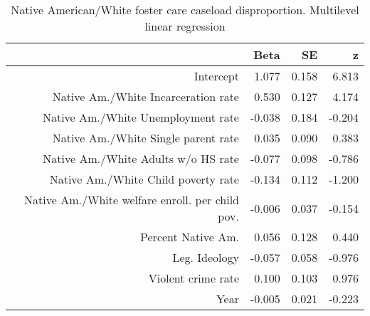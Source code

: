 \begin{table}[ht]
\centering
\begin{tabular}{rrrr}
  \hline
 & Beta & SE & z \\ 
  \hline
Intercept & 1.077 & 0.158 & 6.813 \\ 
  Native Am./White Incarceration rate & 0.530 & 0.127 & 4.174 \\ 
  Native Am./White Unemployment rate & -0.038 & 0.184 & -0.204 \\ 
  Native Am./White Single parent rate & 0.035 & 0.090 & 0.383 \\ 
  Native Am./White Adults w/o HS rate & -0.077 & 0.098 & -0.786 \\ 
  Native Am./White Child poverty rate & -0.134 & 0.112 & -1.200 \\ 
  Native Am./White welfare enroll. per child pov. & -0.006 & 0.037 & -0.154 \\ 
  Percent Native Am. & 0.056 & 0.128 & 0.440 \\ 
  Leg. Ideology & -0.057 & 0.058 & -0.976 \\ 
  Violent crime rate & 0.100 & 0.103 & 0.976 \\ 
  Year & -0.005 & 0.021 & -0.223 \\ 
   \hline
\end{tabular}
\caption{Native American/White foster care caseload disproportion. Multilevel linear regression} 
\label{a.d.tab}
\end{table}
